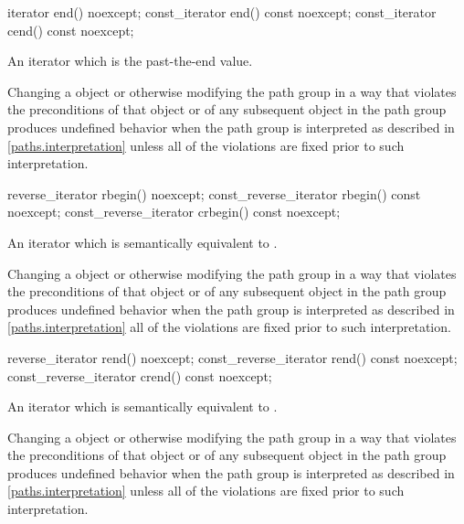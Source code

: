 %
%
\begin{itemdecl}
iterator end() noexcept;
const_iterator end() const noexcept;
const_iterator cend() const noexcept;
\end{itemdecl}
\begin{itemdescr}
\pnum
\returns
An iterator which is the past-the-end value.

\pnum
\remarks
Changing a  object or otherwise modifying the path group in a way that violates the preconditions of that  object or of any subsequent  object in the path group produces undefined behavior when the path group is interpreted as described in \ref{paths.interpretation} unless all of the violations are fixed prior to such interpretation.
\end{itemdescr}

%
%
\begin{itemdecl}
reverse_iterator rbegin() noexcept;
const_reverse_iterator rbegin() const noexcept;
const_reverse_iterator crbegin() const noexcept;
\end{itemdecl}
\begin{itemdescr}
\pnum
\returns
An iterator which is semantically equivalent to .

\pnum
\remarks
Changing a  object or otherwise modifying the path group in a way that violates the preconditions of that  object or of any subsequent  object in the path group produces undefined behavior when the path group is interpreted as described in \ref{paths.interpretation} all of the violations are fixed prior to such interpretation.
\end{itemdescr}

%
%
\begin{itemdecl}
reverse_iterator rend() noexcept;
const_reverse_iterator rend() const noexcept;
const_reverse_iterator crend() const noexcept;
\end{itemdecl}
\begin{itemdescr}
\pnum
\returns
An iterator which is semantically equivalent to .

\pnum
\remarks
Changing a  object or otherwise modifying the path group in a way that violates the preconditions of that  object or of any subsequent  object in the path group produces undefined behavior when the path group is interpreted as described in \ref{paths.interpretation} unless all of the violations are fixed prior to such interpretation.
\end{itemdescr}

